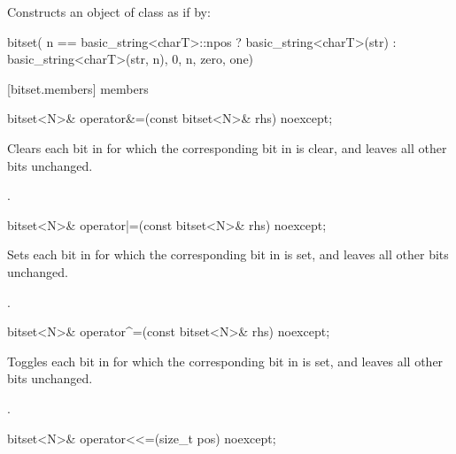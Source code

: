 \begin{itemdescr}
\pnum
\effects Constructs an object of class  as if by:
\begin{codeblock}
bitset(
  n == basic_string<charT>::npos
    ? basic_string<charT>(str)
    : basic_string<charT>(str, n),
  0, n, zero, one)
\end{codeblock}

\end{itemdescr}


[bitset.members]{ members}

%
\begin{itemdecl}
bitset<N>& operator&=(const bitset<N>& rhs) noexcept;
\end{itemdecl}

\begin{itemdescr}
\pnum
\effects
Clears each bit in
for which the corresponding bit in  is clear, and leaves all other bits unchanged.

\pnum
\returns
{}.
\end{itemdescr}

%
\begin{itemdecl}
bitset<N>& operator|=(const bitset<N>& rhs) noexcept;
\end{itemdecl}

\begin{itemdescr}
\pnum
\effects
Sets each bit in
for which the corresponding bit in  is set, and leaves all other bits unchanged.

\pnum
\returns
{}.
\end{itemdescr}

%
\begin{itemdecl}
bitset<N>& operator^=(const bitset<N>& rhs) noexcept;
\end{itemdecl}

\begin{itemdescr}
\pnum
\effects
Toggles each bit in
for which the corresponding bit in  is set, and leaves all other bits unchanged.

\pnum
\returns
{}.
\end{itemdescr}

%
%
\begin{itemdecl}
bitset<N>& operator<<=(size_t pos) noexcept;
\end{itemdecl}

